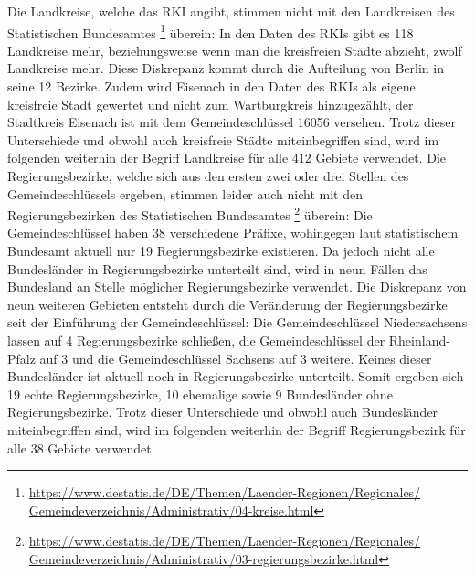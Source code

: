 Die Landkreise, welche das RKI angibt, stimmen nicht mit den Landkreisen des Statistischen Bundesamtes
\footnote{\href{https://www.destatis.de/DE/Themen/Laender-Regionen/Regionales/Gemeindeverzeichnis/Administrativ/04-kreise.html}
{https://www.destatis.de/DE/Themen/Laender-Regionen/Regionales/\\Gemeindeverzeichnis/Administrativ/04-kreise.html}
}
überein: In den Daten des RKIs gibt es 118 Landkreise mehr, beziehungsweise wenn man die kreisfreien Städte abzieht, zwölf Landkreise mehr. Diese Diskrepanz kommt durch die Aufteilung von Berlin in seine 12 Bezirke. Zudem wird Eisenach in den Daten des RKIs als eigene kreisfreie Stadt gewertet und nicht zum Wartburgkreis hinzugezählt, der Stadtkreis Eisenach ist mit dem Gemeindeschlüssel 16056 versehen. Trotz dieser Unterschiede und obwohl auch kreisfreie Städte miteinbegriffen sind, wird im folgenden weiterhin der Begriff \glqq{}Landkreise\grqq{} für alle 412 Gebiete verwendet.
Die Regierungsbezirke, welche sich aus den ersten zwei oder drei Stellen des Gemeindeschlüssels ergeben, stimmen leider auch nicht mit den Regierungsbezirken des Statistischen Bundesamtes
\footnote{
\href{https://www.destatis.de/DE/Themen/Laender-Regionen/Regionales/Gemeindeverzeichnis/Administrativ/03-regierungsbezirke.html}
{https://www.destatis.de/DE/Themen/Laender-Regionen/Regionales/\\Gemeindeverzeichnis/Administrativ/03-regierungsbezirke.html}}
überein: Die Gemeindeschlüssel haben 38 verschiedene Präfixe, wohingegen laut statistischem Bundesamt aktuell nur 19 Regierungsbezirke existieren.
Da jedoch nicht alle Bundesländer in Regierungsbezirke unterteilt sind, wird in neun Fällen das Bundesland an Stelle möglicher Regierungsbezirke verwendet. Die Diskrepanz von neun weiteren Gebieten entsteht durch die Veränderung der Regierungsbezirke seit der Einführung der Gemeindeschlüssel: Die Gemeindeschlüssel Niedersachsens lassen auf 4 Regierungsbezirke schließen, die Gemeindeschlüssel der Rheinland-Pfalz auf 3 und die Gemeindeschlüssel Sachsens auf 3 weitere. Keines dieser Bundesländer ist aktuell noch in Regierungsbezirke unterteilt. Somit ergeben sich 19 echte Regierungsbezirke, 10 ehemalige sowie 9 Bundesländer ohne Regierungsbezirke.
Trotz dieser Unterschiede und obwohl auch Bundesländer miteinbegriffen sind, wird im folgenden weiterhin der Begriff \glqq{}Regierungsbezirk\grqq{} für alle 38 Gebiete verwendet.


